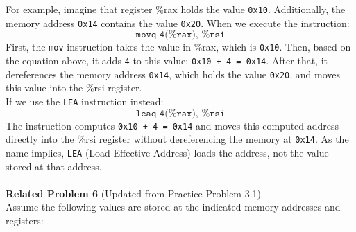 For example, imagine that register \%rax holds the value \texttt{0x10}. Additionally, 
the memory address \texttt{0x14} contains the value \texttt{0x20}. When we execute the 
instruction:
%
\[
\texttt{movq 4(\%rax), \%rsi}
\]
%
First, the \texttt{mov} instruction takes the value in \%rax, which is \texttt{0x10}. 
Then, based on the equation above, it adds \texttt{4} to this value: \texttt{0x10 + 4 = 0x14}. 
After that, it dereferences the memory address \texttt{0x14}, which holds the value \texttt{0x20}, and moves this value into the \%rsi register. \\
%
If we use the \texttt{LEA} instruction instead:
%
\[
\texttt{leaq 4(\%rax), \%rsi}
\]
%
The instruction computes \texttt{0x10 + 4 = 0x14} and moves this computed address 
directly into the \%rsi register without dereferencing the memory at \texttt{0x14}. 
As the name implies, \texttt{LEA} (Load Effective Address) loads the address, not 
the value stored at that address. \\
\\
%
\noindent\textbf{Related Problem 6} (Updated from Practice Problem 3.1) \\
Assume the following values are stored at the indicated memory addresses and registers:

